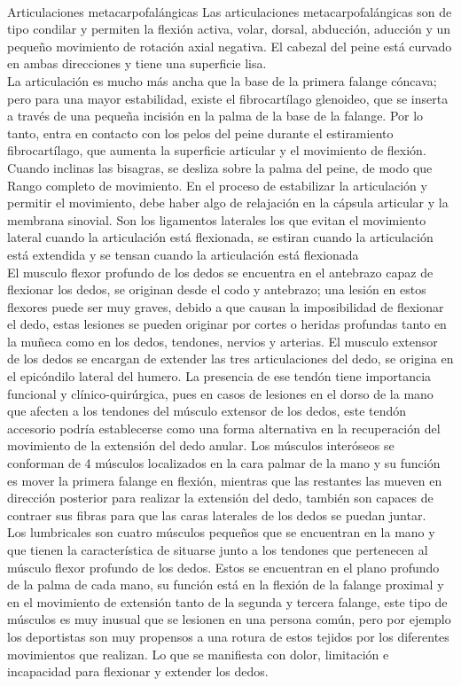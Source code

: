 \documentclass{article}
\begin{document}
\\
Articulaciones metacarpofalángicas Las articulaciones metacarpofalángicas son de tipo condilar y permiten la flexión activa, volar, dorsal, abducción, aducción y un pequeño movimiento de rotación axial negativa. El cabezal del peine está curvado en ambas direcciones y tiene una superficie lisa.
\\
La articulación es mucho más ancha que la base de la primera falange cóncava; pero
para una mayor estabilidad, existe el fibrocartílago glenoideo, que se inserta a través de una pequeña incisión en la palma de la base de la falange. Por lo tanto, entra en contacto con los pelos del peine durante el estiramiento fibrocartílago, que aumenta la superficie articular y el movimiento de flexión.
\\
Cuando inclinas las bisagras, se desliza sobre la palma del peine, de modo que
Rango completo de movimiento. En el proceso de estabilizar la articulación y permitir el movimiento, debe haber algo de relajación en la cápsula articular y la membrana sinovial.
Son los ligamentos laterales los que evitan el movimiento lateral cuando la articulación está flexionada, se estiran cuando la articulación está extendida y se tensan cuando la articulación está flexionada
\\
El musculo flexor profundo de los dedos se encuentra en el antebrazo capaz de flexionar los dedos, se originan desde el codo y antebrazo; una lesión en estos flexores puede ser muy graves, debido a que causan la imposibilidad de flexionar el dedo, estas lesiones se pueden originar por cortes o heridas profundas tanto en la muñeca como en los dedos, tendones, nervios y arterias. El musculo extensor de los dedos se encargan de extender las tres articulaciones del dedo, se origina en el epicóndilo lateral del humero. La presencia de ese tendón tiene importancia funcional y clínico-quirúrgica, pues en casos de lesiones en el dorso de la mano que afecten a los tendones del músculo extensor de los dedos, este tendón accesorio podría establecerse como una forma alternativa en la recuperación del movimiento de la extensión del dedo anular. Los músculos interóseos se conforman de 4 músculos localizados en la cara palmar de la mano y su función es mover la primera falange en flexión, mientras que las restantes las mueven en dirección posterior para realizar la extensión del dedo, también son capaces de contraer sus fibras para que las caras laterales de los dedos se puedan juntar.
\\
Los lumbricales son cuatro músculos pequeños que se encuentran en la mano y que tienen la característica de situarse junto a los tendones que pertenecen al músculo flexor profundo de los dedos. Estos se encuentran en el plano profundo de la palma de cada mano, su función está en la flexión de la falange proximal y en el movimiento de extensión tanto de la segunda y tercera falange, este tipo de músculos es muy inusual que se lesionen en una persona común, pero por ejemplo los deportistas son muy propensos a una rotura de estos tejidos por los diferentes movimientos que realizan. Lo que se manifiesta con dolor, limitación e incapacidad para flexionar y extender los dedos.
\end{document}
